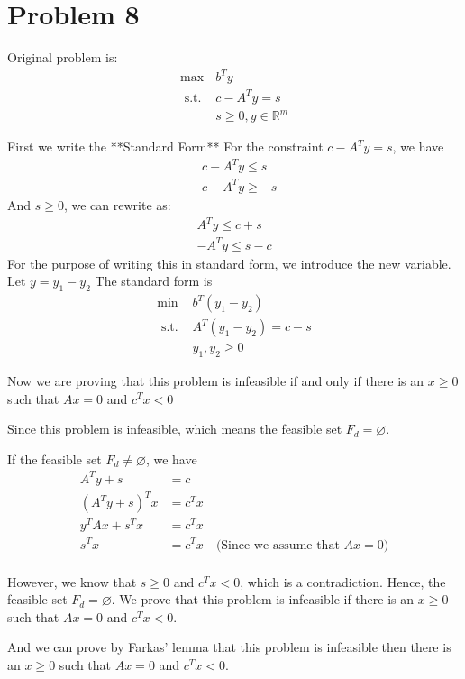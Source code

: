 \documentclass[12pt]{article}
\begin{document}
\clearpage
\section{Problem 8}
Original problem is:
$$\begin{array}{cc}
\max & b^T y \\
\text { s.t. } & c-A^T y=s \\
& s \geq 0, y \in \mathbb{R}^m
\end{array}$$

First we write the **Standard Form**
For the constraint $c-A^T y=s$, we have
$$
\begin{aligned}
& c-A^T y \leq s \\
& c-A^T y \geq-s
\end{aligned}
$$
And $s \geq 0$, we can rewrite as:
$$
\begin{gathered}
A^T y \leq c+s \\
-A^T y \leq s-c
\end{gathered}
$$
For the purpose of writing this in standard form, we introduce the new variable.
Let $y=y_1-y_2$
The standard form is
$$
\begin{array}{cl}
\min & b^T\left(y_1-y_2\right) \\
\text { s.t. } & A^T\left(y_1-y_2\right)=c-s \\
& y_1, y_2 \geq 0
\end{array}
$$

Now we are proving that this problem is infeasible if and only if there is an  $x \geq 0$ such that  $Ax=0$ and  $c^T x<0$

Since this problem is infeasible, which means the feasible set $F_d = \varnothing$.

If the feasible set $F_d \neq \varnothing$, we have 
$$
\begin{aligned}
A^T y + s &= c \\
(A^T y + s)^T x &= c^T x \\
y^T Ax + s^Tx &= c^T x \\
s^T x &= c^T x \quad \text{(Since we assume that $Ax=0$)} \\
\end{aligned}
$$

However, we know that $s \geq 0$ and $c^T x < 0$, which is a contradiction. Hence, the feasible set $F_d = \varnothing$. We prove that this problem is infeasible if there is an $x \geq 0$ such that  $Ax=0$ and  $c^T x<0$.

And we can prove by Farkas' lemma that this problem is infeasible then there is an  $x \geq 0$ such that  $Ax=0$ and  $c^T x<0$.
\end{document}
